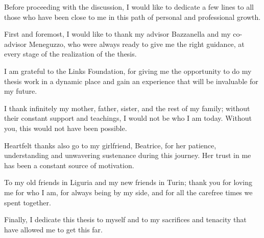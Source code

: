 \ringraziamenti

Before proceeding with the discussion, I would like to dedicate a few lines to all those who have been close to me in this path of personal and professional growth.

First and foremost, I would like to thank my advisor Bazzanella and my co-advisor Meneguzzo, who were always ready to give me the right guidance, at every stage of the realization of the thesis. 

I am grateful to the Links Foundation, for giving me the opportunity to do my thesis work in a dynamic place and gain an experience that will be invaluable for my future. 

I thank infinitely my mother, father, sister, and the rest of my family; without their constant support and teachings, I would not be who I am today. Without you, this would not have been possible.

Heartfelt thanks also go to my girlfriend, Beatrice, for her patience, understanding and unwavering sustenance during this journey. Her trust in me has been a constant source of motivation.

To my old friends in Liguria and my new friends in Turin; thank you for loving me for who I am, for always being by my side, and for all the carefree times we spent together.

Finally, I dedicate this thesis to myself and to my sacrifices and tenacity that have allowed me to get this far.
